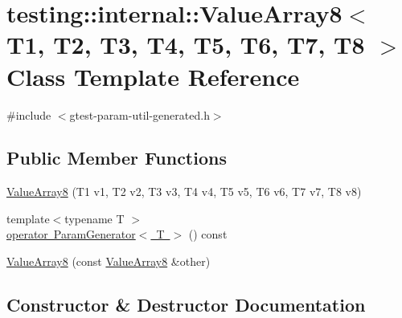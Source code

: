 \hypertarget{classtesting_1_1internal_1_1ValueArray8}{}\section{testing\+::internal\+::Value\+Array8$<$ T1, T2, T3, T4, T5, T6, T7, T8 $>$ Class Template Reference}
\label{classtesting_1_1internal_1_1ValueArray8}


{\ttfamily \#include $<$gtest-\/param-\/util-\/generated.\+h$>$}

\subsection*{Public Member Functions}
\begin{DoxyCompactItemize}
\item 
\mbox{\hyperlink{classtesting_1_1internal_1_1ValueArray8_aa935d771149e26694277b6b9a3f6f5d3}{Value\+Array8}} (T1 v1, T2 v2, T3 v3, T4 v4, T5 v5, T6 v6, T7 v7, T8 v8)
\item 
{\footnotesize template$<$typename T $>$ }\\\mbox{\hyperlink{classtesting_1_1internal_1_1ValueArray8_a265f6e8bc6ceede7e673682ddebb82c5}{operator Param\+Generator$<$ T $>$}} () const
\item 
\mbox{\hyperlink{classtesting_1_1internal_1_1ValueArray8_aa2d57c811dc60c02a487c36b4b6b4464}{Value\+Array8}} (const \mbox{\hyperlink{classtesting_1_1internal_1_1ValueArray8}{Value\+Array8}} \&other)
\end{DoxyCompactItemize}


\subsection{Constructor \& Destructor Documentation}
\mbox{\label{classtesting_1_1internal_1_1ValueArray8_aa935d771149e26694277b6b9a3f6f5d3}} 
